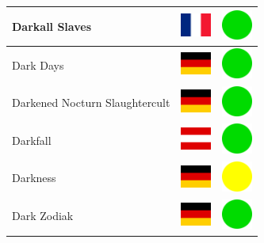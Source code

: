 \documentclass[12pt, a4paper, twoside]{report}
\begin{document}
\begin{center}
\begin{longtable}{|p{5cm}|p{2cm}|p{2cm}|}
 Darkall Slaves                                             & \includegraphics[width=1cm]{../img/flags/fr} &   \includegraphics[width=1cm]{../likes/y} \\ \hline
 Dark Days                                                  & \includegraphics[width=1cm]{../img/flags/de} &   \includegraphics[width=1cm]{../likes/y} \\ \hline
 Darkened Nocturn Slaughtercult                             & \includegraphics[width=1cm]{../img/flags/de} &   \includegraphics[width=1cm]{../likes/y} \\ \hline
 Darkfall                                                   & \includegraphics[width=1cm]{../img/flags/at} &   \includegraphics[width=1cm]{../likes/y} \\ \hline
 Darkness                                                   & \includegraphics[width=1cm]{../img/flags/de} &   \includegraphics[width=1cm]{../likes/m} \\ \hline
 Dark Zodiak                                                & \includegraphics[width=1cm]{../img/flags/de} &   \includegraphics[width=1cm]{../likes/y} \\ \hline

\end{longtable}
\end{center}
\end{document}
